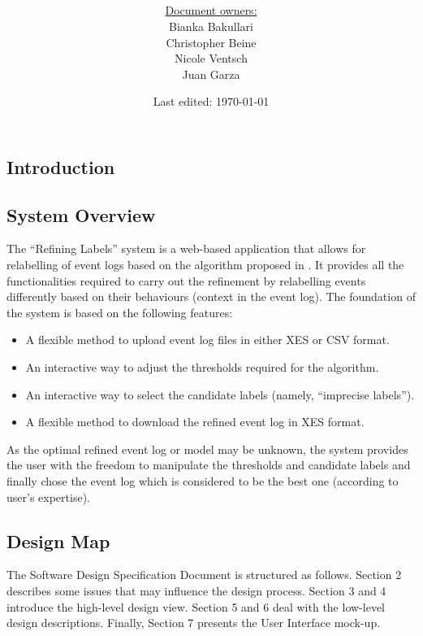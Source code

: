 \documentclass[notitlepage]{article}
\title{%
	\documentName\text{ } \\
  \large \projectName\text{ } \\
  }
\author{
	\large \underline{Document owners:}\\ 
	Bianka Bakullari\\
	\texttt{}
	Christopher Beine\\
	\texttt{}
	Nicole Ventsch\\
	\texttt{}
	Juan Garza\\
	\texttt{}
}
\date{\small{Last edited: \today}}
\begin{document}
\begin{titlepage}
\clearpage\maketitle			%
\thispagestyle{fancy}
\tableofcontents
\end{titlepage}

\rfoot{\thepage}				%


\begin{flushleft}				%


\section{Introduction}
\subsection{System Overview}
The “Refining Labels” system is a web-based application that allows for relabelling of event logs based on the algorithm proposed in \cite{paper}. It provides all the functionalities required to carry out the refinement by relabelling events differently based on their behaviours (context in the event log). 
The foundation of the system is based on the following features:
\begin{itemize}
\item A flexible method to upload event log files in either XES or CSV format.
\item An interactive way to adjust the thresholds required for the algorithm.
\item An interactive way to select the candidate labels (namely, ``imprecise labels”).
\item A flexible method to download the refined event log in XES format.
\end{itemize}
As the optimal refined event log or model may be unknown, the system provides the user with the freedom to manipulate the thresholds and candidate labels and finally chose the event log which is considered to be the best one (according to user’s expertise).

\subsection{Design Map}
The Software Design Specification Document is structured as follows. Section 2 describes some issues that may influence the design process. Section 3 and 4 introduce the high-level design view. Section 5 and 6 deal with the low-level design descriptions. Finally, Section 7 presents the User Interface mock-up. 


\end{flushleft}
\end{document}
